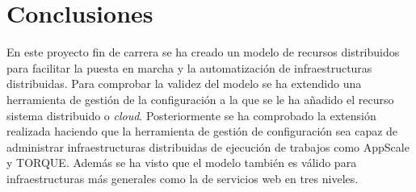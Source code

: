\chapter{Conclusiones}
\label{cap:conclusiones}


En este proyecto fin de carrera se ha creado un modelo de recursos distribuidos para facilitar la puesta en marcha y la automatización de infraestructuras distribuidas. Para comprobar la validez del modelo se ha extendido una herramienta de gestión de la configuración a la que se le ha añadido el recurso sistema distribuido o \emph{cloud}. Posteriormente se ha comprobado la extensión realizada haciendo que la herramienta de gestión de configuración sea capaz de administrar infraestructuras distribuidas de ejecución de trabajos como AppScale y TORQUE. Además se ha visto que el modelo también es válido para infraestructuras más generales como la de servicios web en tres niveles.
